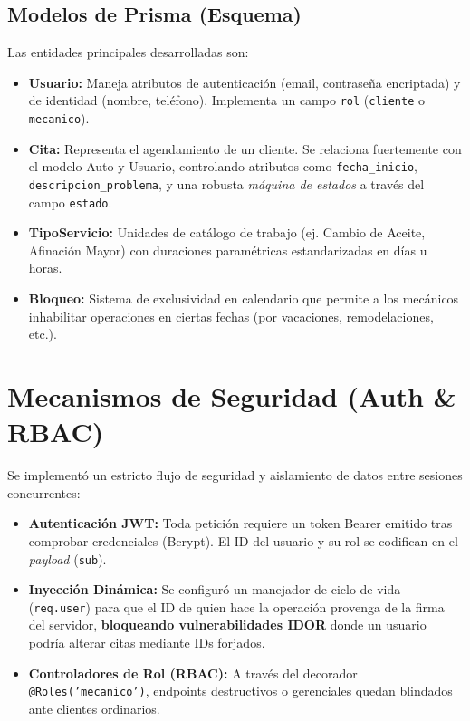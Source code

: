 \documentclass[12pt,a4paper]{article}
\begin{document}
\subsection{Modelos de Prisma (Esquema)}
Las entidades principales desarrolladas son:
\begin{itemize}
    \item \textbf{Usuario:} Maneja atributos de autenticación (email, contraseña encriptada) y de identidad (nombre, teléfono). Implementa un campo \texttt{rol} (\texttt{cliente} o \texttt{mecanico}).
    \item \textbf{Cita:} Representa el agendamiento de un cliente. Se relaciona fuertemente con el modelo Auto y Usuario, controlando atributos como \texttt{fecha\_inicio}, \texttt{descripcion\_problema}, y una robusta \textit{máquina de estados} a través del campo \texttt{estado}.
    \item \textbf{TipoServicio:} Unidades de catálogo de trabajo (ej. Cambio de Aceite, Afinación Mayor) con duraciones paramétricas estandarizadas en días u horas.
    \item \textbf{Bloqueo:} Sistema de exclusividad en calendario que permite a los mecánicos inhabilitar operaciones en ciertas fechas (por vacaciones, remodelaciones, etc.).
\end{itemize}

\section{Mecanismos de Seguridad (Auth \& RBAC)}
Se implementó un estricto flujo de seguridad y aislamiento de datos entre sesiones concurrentes:
\begin{itemize}
    \item \textbf{Autenticación JWT:} Toda petición requiere un token Bearer emitido tras comprobar credenciales (Bcrypt). El ID del usuario y su rol se codifican en el \textit{payload} (\texttt{sub}).
    \item \textbf{Inyección Dinámica:} Se configuró un manejador de ciclo de vida (\texttt{req.user}) para que el ID de quien hace la operación provenga de la firma del servidor, \textbf{bloqueando vulnerabilidades IDOR} donde un usuario podría alterar citas mediante IDs forjados.
    \item \textbf{Controladores de Rol (RBAC):} A través del decorador \texttt{@Roles('mecanico')}, endpoints destructivos o gerenciales quedan blindados ante clientes ordinarios.
\end{itemize}
\end{document}
